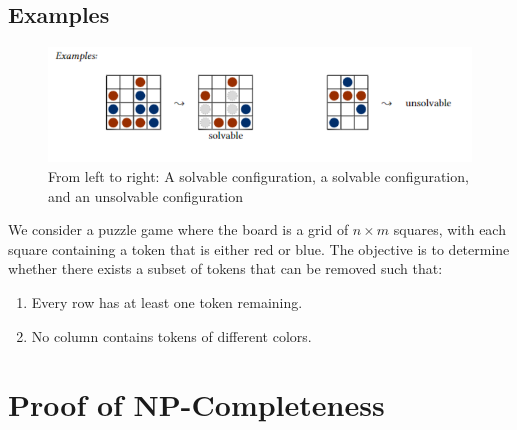 \documentclass{article}
\begin{document}
\subsection*{Examples}
    \begin{figure}[h]
        \centering
        \includegraphics[width=1.3\linewidth]{image.png}
        \caption{From left to right: A solvable configuration, a solvable configuration, and an unsolvable configuration}
        \label{fig:Examples}
    \end{figure}
We consider a puzzle game where the board is a grid of \(n \times m\) squares, with each square containing a token that is either red or blue. The objective is to determine whether there exists a subset of tokens that can be removed such that:
\begin{enumerate}
    \item Every row has at least one token remaining.
    \item No column contains tokens of different colors.
\end{enumerate}

\section*{Proof of NP-Completeness}
\end{document}
